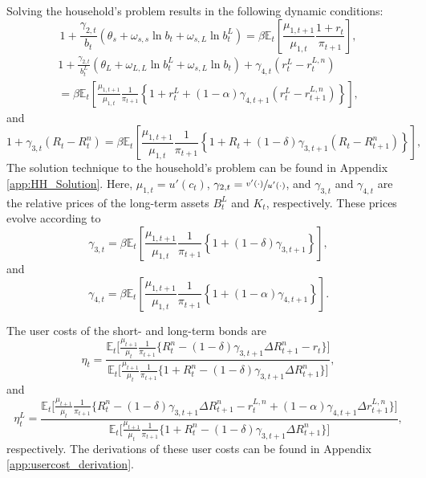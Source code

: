\documentclass[11pt,a4paper,margin=1.5in]{article}
\begin{document}
Solving the household's problem results in the following dynamic conditions:
\begin{equation}
	1 + \frac{\gamma_{2,t}}{b_t}\left(\theta_s + \omega_{s,s}\ln b_t + \omega_{s,L}\ln b^L_t\right) = \beta \mathbb{E}_t\!\left[\frac{\mu_{1,t+1}}{\mu_{1,t}}\frac{1+r_t}{\pi_{t+1}}\right],
	\label{eq:HH_manOC_B}
\end{equation}
%
\begin{multline}
	1 + \frac{\gamma_{2,t}}{b^L_t}\left(\theta_L + \omega_{L,L}\ln b^L_t + \omega_{s,L}\ln b_t\right) + \gamma_{4,t}\left(r^L_t-r^{L,n}_t\right) \\
	= \beta \mathbb{E}_t\!\left[\frac{\mu_{1,t+1}}{\mu_{1,t}}\frac{1}{\pi_{t+1}} \left\{ 1+r^L_t + (1-\alpha)\gamma_{4,t+1} \left(r^L_t-r^{L,n}_{t+1}\right)\right\}\right],
	\label{eq:HH_manOC_BL}
\end{multline}
%
and
\begin{equation}
	1 + \gamma_{3,t}\left(R_t - R^{n}_t\right)  = \beta\mathbb{E}_t\!\left[\frac{\mu_{1,t+1}}{\mu_{1,t}}\frac{1}{\pi_{t+1}}\left\{ 1 + R_{t} + (1-\delta)\gamma_{3,{t+1}}\left(R_{t} - R^{n}_{t+1}\right)\right\}\right],
	\label{eq:HH_manOC_K}
\end{equation}
The solution technique to the household's problem can be found in Appendix \ref{app:HH_Solution}.
Here, $\mu_{1,t} = u'(c_t)$, $\gamma_{2,t} = \sfrac{v'(\cdot)}{u'(\cdot)}$, and $\gamma_{3,t}$ and $\gamma_{4,t}$ are the relative prices of the long-term assets $B^L_t$ and $K_t$, respectively.
These prices evolve according to
\begin{equation}
	\gamma_{3,t} = \beta\mathbb{E}_t\!\left[\frac{\mu_{1,t+1}}{\mu_{1,t}}\frac{1}{\pi_{t+1}} \left\{1 + (1-\delta)\gamma_{3,{t+1}}\right\}\right],
	\label{eq:HH_manOC_R}
\end{equation}
%
and
\begin{equation}
	\gamma_{4,t} = \beta\mathbb{E}_t\!\left[\frac{\mu_{1,t+1}}{\mu_{1,t}}\frac{1}{\pi_{t+1}} \left\{1 + (1-\alpha)\gamma_{4,{t+1}}\right\}\right].
	\label{eq:HH_manOC_rL}
\end{equation}

The user costs of the short- and long-term bonds are 
\begin{equation}
	\eta_t = \frac{\mathbb{E}_t \Big[ \frac{\mu_{t+1}}{\mu_{t}}\frac{1}{\pi_{t+1}} \Big\{ R^n_t - (1-\delta)\gamma_{3,t+1}\Delta R^n_{t+1} - r_t \Big\}\Big]}{\mathbb{E}_t \Big[ \frac{\mu_{t+1}}{\mu_{t}}\frac{1}{\pi_{t+1}} \Big\{ 1+ R^n_t - (1-\delta)\gamma_{3,t+1}\Delta R^n_{t+1}\Big\}\Big]},
\end{equation}
and
\begin{equation}
\eta^L_t = \frac{\mathbb{E}_t \Big[ \frac{\mu_{t+1}}{\mu_{t}}\frac{1}{\pi_{t+1}} \Big\{ R^n_t  - (1-\delta)\gamma_{3,t+1}\Delta R^n_{t+1} - r^{L,n}_t + (1-\alpha)\gamma_{4,t+1}\Delta r^{L,n}_{t+1}\Big\}\Big]}{\mathbb{E}_t \Big[ \frac{\mu_{t+1}}{\mu_{t}}\frac{1}{\pi_{t+1}} \Big\{ 1+ R^n_t - (1-\delta)\gamma_{3,t+1}\Delta R^n_{t+1}\Big\}\Big]},
\label{eq:usercost_LT}
\end{equation}
respectively.
The derivations of these user costs can be found in Appendix \ref{app:usercost_derivation}.
\end{document}
